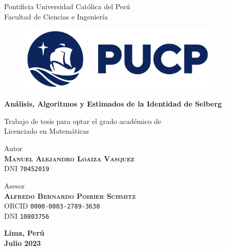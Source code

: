 \thispagestyle{empty}

\bigskip

\begin{center}
  {\baselineskip=30pt \Large Pontificia Universidad Cat\'olica del Per\'u} \\
  {\baselineskip=30pt \large Facultad de Ciencias e Ingenier\'ia}
\end{center}

\bigskip

\begin{figure}[H]
  \begin{center}
    \includegraphics[width=9.5cm]{images/2021-pucp-logo.png}
  \end{center}
\end{figure}

\begin{center}
  \begin{minipage}{14.0cm}
    \begin{center}
      \textcolor{pucp}
      {\textbf{\Huge{An\'alisis, Algoritmos y Estimados de la Identidad
      de Selberg}}}
    \end{center}
  \end{minipage}
\end{center}

\vspace*{2.00cm}

\begin{center}
  Trabajo de tesis para optar el grado acad\'emico de \\
  Licenciado en Matem\'aticas
\end{center}

\vspace*{2.00cm}

\begin{center}
  Autor \\
  \textbf{\textsc{Manuel Alejandro Loaiza Vasquez}} \\
  DNI \texttt{70452019}
\end{center}

\vspace*{0.5cm}

\begin{center}
  Asesor \\
  \textbf{\textsc{Alfredo Bernardo Poirier Schmitz}} \\
  ORCID \texttt{0000-0003-2789-3630} \\
  DNI \texttt{10803756}
\end{center}

\vspace*{1.00cm}

\begin{center}
  {
    \baselineskip=10pt
    \textbf{Lima, Per\'u} \\
    \textbf{Julio 2023}
  }
\end{center}

